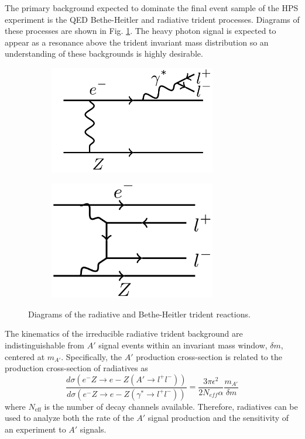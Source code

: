 The primary background expected to dominate the final event sample of the HPS 
experiment is the QED Bethe-Heitler and radiative trident processes.  Diagrams
of these processes are shown in Fig. \ref{fig:tridents}. The heavy photon 
signal is expected to appear as a resonance above the trident invariant mass
distribution so an understanding of these backgrounds is highly desirable. 
\begin{figure}[t]
    \begin{subfigure}{.5\textwidth}
        \centering
        \includegraphics[width=0.8\textwidth]{images/radiative.png}
    \end{subfigure}
    \begin{subfigure}{.5\textwidth}
        \centering
        \includegraphics[width=0.8\textwidth]{images/bethe-heitler.png}
    \end{subfigure}
    \caption{Diagrams of the radiative and Bethe-Heitler trident reactions.}
    \label{fig:tridents}
\end{figure}  

The kinematics of the irreducible radiative trident background are indistinguishable 
from $A'$ signal events 
within an invariant mass window, $\delta m$, centered at $m_{A'}$. Specifically, 
the $A'$ production cross-section is related to the production cross-section of 
radiatives as 
\begin{equation}
    \frac{d\sigma(e^-Z\rightarrow e-Z(A'\rightarrow l^+l^-))}
    {d\sigma(e^-Z\rightarrow e-Z(\gamma^*\rightarrow l^+l^-))}
    = \frac{3\pi\epsilon^{2}}{2 N_{eff} \alpha} \frac{m_{A'}}{\delta m}
\end{equation}
where $N_{\text{eff}}$ is the number of decay channels available.
Therefore, radiatives can be used to analyze both the rate of the $A'$ signal 
production and the sensitivity of an experiment to $A'$ signals.

